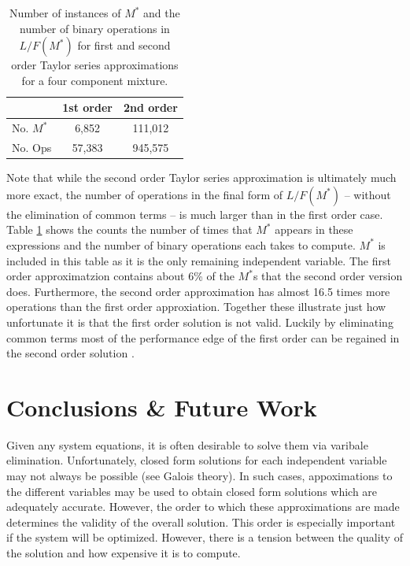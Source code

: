 \documentclass{ansconf}
\begin{document}
\begin{table}[htbp]
\begin{center}
\caption{Number of instances of $M^*$ and the number of binary operations in 
         $L/F(M^*)$ for first and second order Taylor series approximations for a 
         four component mixture.}
\begin{tabular}{|l||c|c|}
\hline
& \bf{1st order} & \bf{2nd order} \\
\hline
No. $M^*$ & 6,852  &  111,012 \\ 
\hline
No. Ops   & 57,383 &  945,575 \\ 
\hline
\end{tabular}
\label{count_ops}
\end{center}
\end{table}


Note that while the second order Taylor series approximation is ultimately much more 
exact, the number of operations in the final form of $L/F(M^*)$ -- without the 
elimination of common terms -- is much larger than 
in the first order case.  Table \ref{count_ops} shows the counts the number of times
that $M^*$ appears in these expressions and the number of binary operations each 
takes to compute.  $M^*$ is included in this table as it is the only remaining 
independent variable.  The first order approximatzion contains about 6\% of the
$M^*$s that the second order version does.  Furthermore, the second order 
approximation has almost 16.5 times more operations than the first order 
approxiation.  Together these illustrate just how unfortunate it is that the first
order solution is not valid.  Luckily by eliminating common terms most of the 
performance edge of the first order can be regained in the second order solution
\cite{Scopatz2012}.

\section{Conclusions \& Future Work}
\label{sec:conc}

Given any system equations, it is often desirable to solve them via varibale 
elimination.  Unfortunately, closed form solutions for each independent variable
may not always be possible (see Galois theory).  In such cases, appoximations to 
the different variables may be used to obtain closed form solutions which are
adequately accurate.  However, the order to which these approximations are made
determines the validity of the overall solution.  This order is especially 
important if the system will be optimized.  However, there is a tension between 
the quality of the solution and how expensive it is to compute.
\end{document}
